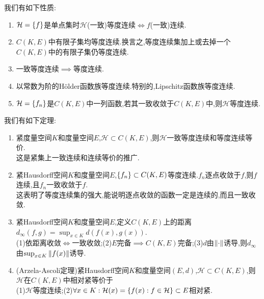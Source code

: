 \documentclass{article}
\begin{document}
我们有如下性质:
\begin{enumerate}
    \item $\mathcal{H}=\left\{f\right\}$是单点集时$\mathcal{H}$(一致)等度连续$\iff f$(一致)连续.
    \item $C(K,E)$中有限子集均等度连续.换言之,等度连续集加上或去掉一个$C(K,E)$中的有限子集仍等度连续.
    \item 一致等度连续$\implies$等度连续.
    \item 以常数为阶的H\"older函数族等度连续.特别的,Lipschitz函数族等度连续.
    \item $\mathcal{H}=\left\{f_n\right\}$是$C(K,E)$中一列函数,若其一致收敛于$C(K,E)$中,则$\mathcal{H}$等度连续.\\
\end{enumerate}
我们有如下定理:
\begin{enumerate}[resume]
    \item 紧度量空间$K$和度量空间$E$,$\mathcal{H}\subset C(K,E)$,则$\mathcal{H}$一致等度连续和等度连续等价.\\这是紧集上一致连续和连续等价的推广.
    \item 紧Hausdorff空间$K$和度量空间$E$,$\left\{f_n\right\}\subset C(K,E)$等度连续.$f_n$逐点收敛于$f$,则$f$连续,且$f_n$一致收敛于$f$.\\这表明了等度连续集的强大,能说明逐点收敛的函数一定是连续的,而且一致收敛.\\
    \item 紧Hausdorff空间$K$和度量空间$E$,定义$C(K,E)$上的距离$d_\infty(f,g)=\sup_{x\in K}d(f(x),g(x))$.\\
    (1)依距离收敛$\iff$一致收敛;(2)$E$完备$\implies C(K,E)$完备;(3)$d$由$\left\|\cdot\right\|$诱导,则$d_\infty$由$\sup_{x\in K}\left\|f(x)\right\|$诱导.\\
    \item (Arzela-Ascoli定理)紧Hausdorff空间$K$和度量空间$(E,d)$,$\mathcal{H}\subset C(K,E)$,则$\mathcal{H}$在$C(K,E)$中相对紧等价于\\(1)$\mathcal{H}$等度连续;(2)$\forall x\in K:\mathcal{H}(x)=\left\{f(x):f\in\mathcal{H}\right\}\subset E$相对紧.
\end{enumerate}
\end{document}
